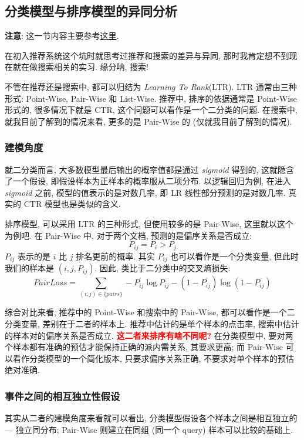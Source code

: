 \subsection{分类模型与排序模型的异同分析}
\textbf{注意}: 这一节内容主要参考\href{https://zhuanlan.zhihu.com/p/502638808?utm_source=wechat_session&utm_medium=social&utm_oi=797192809567354880&utm_campaign=shareopn}{这里}.

在初入推荐系统这个坑时就思考过推荐和搜索的差异与异同, 那时我肯定想不到现在就在做搜索相关的实习. 缘分呐, 搜索!

不管在推荐还是搜索中, 都可以归结为 \textit{Learning To Rank}(LTR). LTR 通常由三种形式: Point-Wise, Pair-Wise 和 List-Wise. 推荐中, 排序的依据通常是 Point-Wise 形式的, 很多情况下就是 CTR, 这个问题可以看作是一个二分类的问题. 在搜索中, 就我目前了解到的情况来看, 更多的是 Pair-Wise 的 (仅就我目前了解到的情况).

\subsubsection{建模角度}
就二分类而言, 大多数模型最后输出的概率值都是通过 \textit{sigmoid} 得到的, 这就隐含了一个假设, 即假设样本为正样本的概率服从二项分布. 以逻辑回归为例, 在进入 \textit{sigmoid} 之前, 模型的值表示的是对数几率, 即 LR 线性部分预测的是对数几率. 真实的 CTR 模型也是类似的含义.

排序模型, 可以采用 LTR 的三种形式, 但使用较多的是 Pair-Wise, 这里就以这个为例吧. 在 Pair-Wise 中, 对于两个文档, 预测的是偏序关系是否成立:
$$
P_{i j} = P_{i} > P_{j}
$$
$P_{ij}$ 表示的是 $i$ 比 $j$ 排名更前的概率. 其实 $P_{ij}$ 也可以看作是一个分类变量, 但此时我们的样本是 $(i, j, P_{ij})$. 因此, 类比于二分类中的交叉熵损失:
$$
PairLoss = \sum_{(i, j) \in \{pairs\}} -P^\prime_{ij} \log P_{ij} - (1 - P^\prime_{ij}) \log (1 - P_{ij})
$$

综合对比来看, 推荐中的 Point-Wise 和搜索中的 Pair-Wise, 都可以看作是一个二分类变量, 差别在于二者的样本上. 推荐中估计的是单个样本的点击率, 搜索中估计的样本对的偏序关系是否成立. \textbf{\textcolor{red}{这二者来排序有啥不同呢?}} 在分类模型中, 要对两个样本都有准确的预估才能保持正确的派内需关系, 其要求更高; 而 Pair-Wise 可以看作分类模型的一个简化版本, 只要求偏序关系正确, 不要求对单个样本的预估绝对准确.

\subsubsection{事件之间的相互独立性假设} 
其实从二者的建模角度来看就可以看出, 分类模型假设各个样本之间是相互独立的 --- 独立同分布; Pair-Wise 则建立在同组 (同一个 query) 样本可以比较的基础上. 

